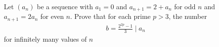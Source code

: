 Let $(a_n)$ be a sequence with $a_1=0$ and $a_{n+1}=2+a_n$ for odd $n$ and $a_{n+1}=2a_n$ for even $n$. Prove that for each prime $p>3$, the number
\begin{align*} b=\frac{2^{2p}-1}{3} \mid a_n \end{align*}for infinitely many values of $n$